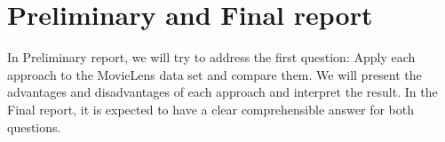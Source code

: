 \documentclass[bj, preprint]{imsart}
\begin{document}
\section{Preliminary and Final report}\label{sec:report}
In Preliminary report, we will try to address the first question: Apply each approach to the MovieLens data set and compare them. We will present the advantages and disadvantages of each approach and interpret the result. In the Final report, it is expected to have a clear comprehensible answer for both questions.


{}
\end{document}
